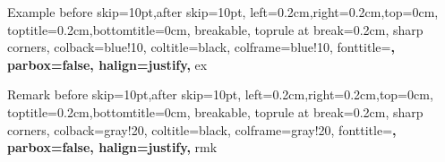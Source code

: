
\newtheorem{thm}{Theorem}[chapter]
\newtheorem{cor}[thm]{Corollary}
\newtheorem{lem}[thm]{Lemma}
\newtheorem{fct}[thm]{Fact}

\theoremstyle{definition}
\newtheorem{defn}[thm]{Definition}



\def\b{\textcolor{blue}}
\def\r{\textcolor{red}}
\def\g{\textcolor{green}}
\def\purple{\textcolor{purple}}

\usepackage{xcolor,amsmath}
\usepackage[linesnumbered,ruled,vlined,algochapter]{algorithm2e}
\DontPrintSemicolon
\makeatletter
    \let\c@algocf\c@thm
\makeatother
{}

\renewcommand{\KwSty}[1]{\textnormal{\textcolor{blue!90!black}{\ttfamily\bfseries #1}}\unskip}
\renewcommand{\ArgSty}[1]{\textnormal{\ttfamily #1}\unskip}
\renewcommand{\CommentSty}[1]{\textnormal{\ttfamily\color{green!50!black}#1}\unskip}
\newcommand{\assign}{\leftarrow}
\newcommand{\var}{\texttt}
\newcommand{\FuncCall}[2]{\texttt{\bfseries #1(#2)}}
\renewcommand{\ProgSty}[1]{\texttt{\bfseries #1}}

  {Example}
  {%
    before skip=10pt,after skip=10pt,
    left=0.2cm,right=0.2cm,top=0cm,
    toptitle=0.2cm,bottomtitle=0cm,
    breakable,
    toprule at break=0.2cm,
    sharp corners,
    colback=blue!10,
    coltitle=black,
    colframe=blue!10,
    fonttitle=\bfseries,
    parbox=false,
    halign=justify, %
  }%
  {ex}%

  {Remark}
  {%
    before skip=10pt,after skip=10pt,
    left=0.2cm,right=0.2cm,top=0cm,
    toptitle=0.2cm,bottomtitle=0cm,
    breakable,
    toprule at break=0.2cm,
    sharp corners,
    colback=gray!20,
    coltitle=black,
    colframe=gray!20,
    fonttitle=\bfseries,
    parbox=false,
    halign=justify,
  }%
  {rmk}%

